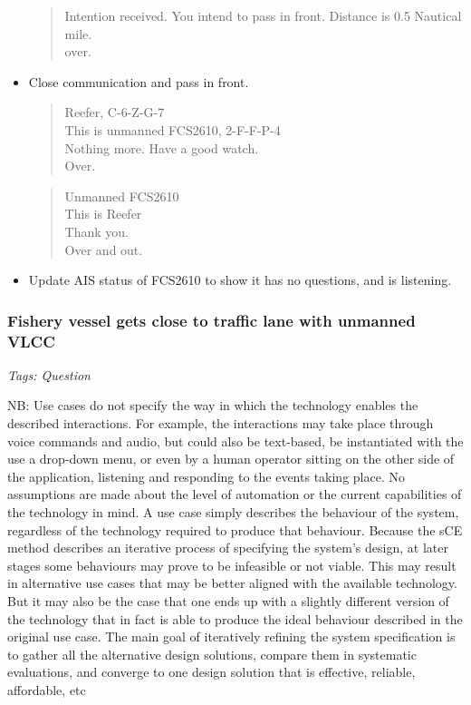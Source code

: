 \begin{itemize}
\begin{quote}
			Intention received. You intend to pass in front. Distance is 0.5 Nautical mile.\\
			over.
		\end{quote}
	\item Close communication and pass in front.
		\begin{quote}
			Reefer, C-6-Z-G-7\\
			This is unmanned FCS2610, 2-F-F-P-4 \\
			Nothing more. Have a good watch. \\
			Over.
		\end{quote}
		\begin{quote}
			Unmanned FCS2610\\
			This is Reefer\\
			Thank you. \\
			Over and out.
		\end{quote}
	\item Update AIS status of FCS2610 to show it has no questions, and is listening.
\end{itemize}

\subsubsection{Fishery vessel gets close to traffic lane with unmanned VLCC}
\emph{Tags: Question}

NB: Use cases do not specify the way in which the technology enables the described interactions. For example, the interactions may take place through voice commands and audio, but could also be text-based, be instantiated with the use a drop-down menu, or even by a human operator sitting on the other side of the application, listening and responding to the events taking place. No assumptions are made about the level of automation or the current capabilities of the technology in mind. A use case simply describes the behaviour of the system, regardless of the technology required to produce that behaviour. Because the sCE method describes an iterative process of specifying the system’s design, at later stages some behaviours may prove to be infeasible or not viable. This may result in alternative use cases that may be better aligned with the available technology. But it may also be the case that one ends up with a slightly different version of the technology that in fact is able to produce the ideal behaviour described in the original use case. The main goal of iteratively refining the system specification is to gather all the alternative design solutions, compare them in systematic evaluations, and converge to one design solution that is effective, reliable, affordable, etc

